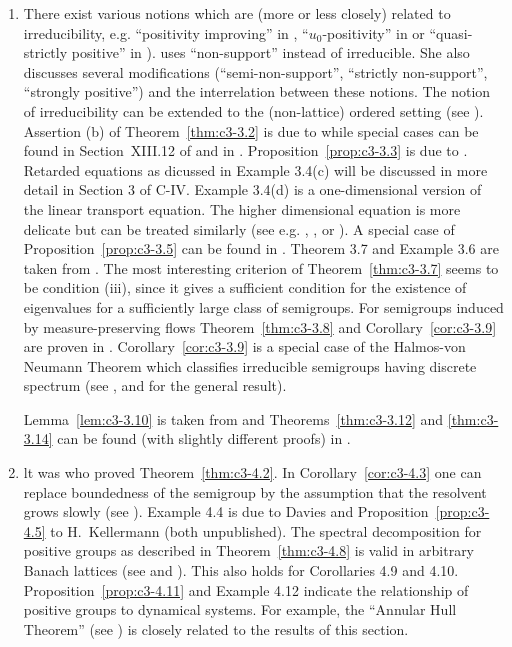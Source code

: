 \begin{enumerate}[label=\emph{Section \arabic*:}, wide]
\item
There exist various notions which are (more or less closely) related to irreducibility, e.g. \enquote{positivity improving} in \citet{reedsimon:1979}, \enquote{$u_0$-positivity} in 
\citet{krasnoselskii:1964}
or \enquote{quasi-strictly positive} in \citet{karlin:1959}). \citet{sawashima:1964} uses \enquote{non-support} instead of irreducible. 
She also discusses several modifications (\enquote{semi-non-support}, \enquote{strictly non-support}, \enquote{strongly positive}) and the interrelation between these notions. 
The notion of irreducibility can be extended to the (non-lattice) ordered setting (see \citet{battyrobinson:1984}). 
Assertion (b) of Theorem~\ref{thm:c3-3.2} is due to \citet{majewskirobinson:1983} while special cases can be found in Section~XIII.12 of \citet{reedsimon:1979} and in \citet{kishimotorobinson:1981}. 
Proposition~\ref{prop:c3-3.3} is due to \citet{voigt:1984a}. 
Retarded equations as dicussed in Example 3.4(c) will be discussed in more detail in Section 3 of C-IV. Example 3.4(d) is a one-dimensional version of the linear transport equation. 
The higher dimensional equation is more delicate but can be treated similarly (see e.g. \citet{greiner:1984b}, \citet{kaperetal:1983a}, or \citet{voigt:1984b}). 
A special case of Proposition~\ref{prop:c3-3.5} can be found
%
in \citet{davies:1980}. 
Theorem 3.7 and Example 3.6 are taken from \citet{schaefer:1985}. 
The most interesting criterion of Theorem~\ref{thm:c3-3.7} seems to be condition (iii), since it gives a sufficient condition for the existence of eigenvalues for a sufficiently large class of semigroups. 
For semigroups induced by measure-preserving flows Theorem~\ref{thm:c3-3.8} and Corollary~\ref{cor:c3-3.9} are proven in \citet{cornfeldetal:1982}. 
Corollary~\ref{cor:c3-3.9} is a special case of the Halmos-von Neumann Theorem which classifies irreducible semigroups having discrete spectrum (see \citet{cornfeldetal:1982}, \citet{greiner:1982} and \citet{schaefer:1974} for the general result). 

Lemma~\ref{lem:c3-3.10} is taken from 
\citet{groh:1984b}
and Theorems~\ref{thm:c3-3.12} and \ref{thm:c3-3.14} can be found (with slightly different proofs) in \citet{greiner:1981}. 

\item 
lt was \citet{derndinger:1980} who proved Theorem~\ref{thm:c3-4.2}. 
In Corollary~\ref{cor:c3-4.3} one can replace boundedness of the semigroup by the assumption that the resolvent grows slowly (see \citet{greiner:1982}). 
Example 4.4 is due to Davies and Proposition~\ref{prop:c3-4.5} to H.~Kellermann (both unpublished). 
The spectral decomposition for positive groups as described in Theorem~\ref{thm:c3-4.8} is valid in arbitrary Banach lattices (see \citet{arendt:1982} and \citet{greiner:1984c}). 
This also holds for Corollaries 4.9 and 4.10. 
Proposition~\ref{prop:c3-4.11} and Example 4.12 indicate the relationship of positive groups to dynamical systems. 
For example, the \enquote{Annular Hull Theorem} (see \citet{chiconeswanson:1981}) is closely related to the results of this section.
\end{enumerate}



\RaggedRight

 